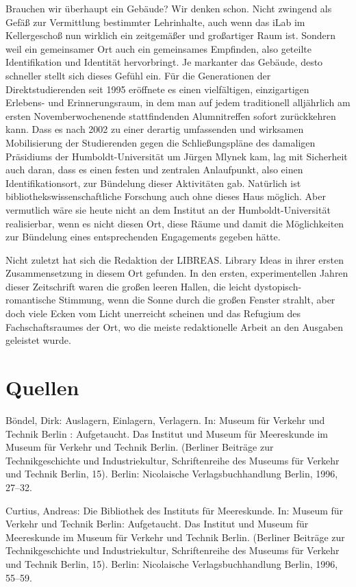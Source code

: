 \documentclass[a4paper,
fontsize=11pt,
oneside,
numbers=noperiodatend,
parskip=half-,
bibliography=totoc,
final
]{scrartcl}
\begin{document}
Brauchen wir überhaupt ein Gebäude? Wir denken schon. Nicht zwingend als
Gefäß zur Vermittlung bestimmter Lehrinhalte, auch wenn das iLab im
Kellergeschoß nun wirklich ein zeitgemäßer und großartiger Raum ist.
Sondern weil ein gemeinsamer Ort auch ein gemeinsames Empfinden, also
geteilte Identifikation und Identität hervorbringt. Je markanter das
Gebäude, desto schneller stellt sich dieses Gefühl ein. Für die
Generationen der Direktstudierenden seit 1995 eröffnete es einen
vielfältigen, einzigartigen Erlebens- und Erinnerungsraum, in dem man
auf jedem traditionell alljährlich am ersten Novemberwochenende
stattfindenden Alumnitreffen sofort zurückkehren kann. Dass es nach 2002
zu einer derartig umfassenden und wirksamen Mobilisierung der
Studierenden gegen die Schließungspläne des damaligen Präsidiums der
Humboldt-Universität um Jürgen Mlynek kam, lag mit Sicherheit auch
daran, dass es einen festen und zentralen Anlaufpunkt, also einen
Identifikationsort, zur Bündelung dieser Aktivitäten gab. Natürlich ist
bibliothekswissenschaftliche Forschung auch ohne dieses Haus möglich.
Aber vermutlich wäre sie heute nicht an dem Institut an der
Humboldt-Universität realisierbar, wenn es nicht diesen Ort, diese Räume
und damit die Möglichkeiten zur Bündelung eines entsprechenden
Engagements gegeben hätte.

Nicht zuletzt hat sich die Redaktion der LIBREAS. Library Ideas in ihrer
ersten Zusammensetzung in diesem Ort gefunden. In den ersten,
experimentellen Jahren dieser Zeitschrift waren die großen leeren
Hallen, die leicht dystopisch-romantische Stimmung, wenn die Sonne durch
die großen Fenster strahlt, aber doch viele Ecken vom Licht unerreicht
scheinen und das Refugium des Fachschaftsraumes der Ort, wo die meiste
redaktionelle Arbeit an den Ausgaben geleistet wurde.

\hypertarget{quellen}{%
\section{Quellen}\label{quellen}}

Böndel, Dirk: Auslagern, Einlagern, Verlagern. In: Museum für Verkehr
und Technik Berlin : Aufgetaucht. Das Institut und Museum für
Meereskunde im Museum für Verkehr und Technik Berlin. (Berliner Beiträge
zur Technikgeschichte und Industriekultur, Schriftenreihe des Museums
für Verkehr und Technik Berlin, 15). Berlin: Nicolaische
Verlagsbuchhandlung Berlin, 1996, 27--32.

Curtius, Andreas: Die Bibliothek des Instituts für Meereskunde. In:
Museum für Verkehr und Technik Berlin: Aufgetaucht. Das Institut und
Museum für Meereskunde im Museum für Verkehr und Technik Berlin.
(Berliner Beiträge zur Technikgeschichte und Industriekultur,
Schriftenreihe des Museums für Verkehr und Technik Berlin, 15). Berlin:
Nicolaische Verlagsbuchhandlung Berlin, 1996, 55--59.
\end{document}
